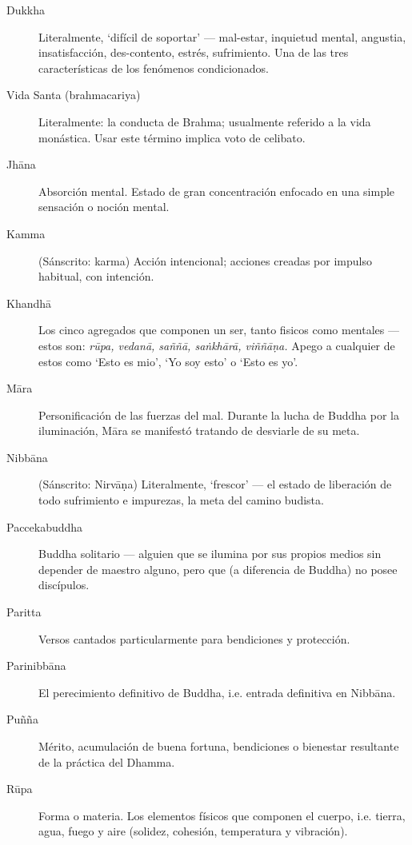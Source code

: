\begin{description}
\item[Dukkha] Literalmente, ‘difícil de soportar’ --- mal-estar, inquietud mental, angustia, insatisfacción, des-contento, estrés, sufrimiento. Una de las tres características de los fenómenos condicionados.

\item[Vida Santa (brahmacariya)] Literalmente: la conducta de Brahma; usualmente referido a la vida monástica. Usar este término implica voto de celibato.

\item[Jhāna] Absorción mental. Estado de gran concentración enfocado en una simple sensación o noción mental.

\item[Kamma] (Sánscrito: karma) Acción intencional; acciones creadas por impulso habitual, con intención.

\item[Khandhā] Los cinco agregados que componen un ser, tanto fisicos como mentales ---
  estos son: \emph{rūpa, vedanā, saññā, saṅkhārā, viññāṇa.} Apego a cualquier de estos como ‘Esto es mio’, ‘Yo soy esto’ o ‘Esto es yo’.

\item[Māra] Personificación de las fuerzas del mal. Durante la lucha de Buddha por la iluminación, Māra se manifestó tratando de desviarle de su meta.

\item[Nibbāna] (Sánscrito: Nirvāṇa) Literalmente, ‘frescor’ --- el estado de liberación de todo sufrimiento e impurezas, la meta del camino budista.

\item[Paccekabuddha] Buddha solitario --- alguien que se ilumina por sus propios medios sin depender de maestro alguno, pero que (a diferencia de Buddha) no posee discípulos.

\item[Paritta] Versos cantados particularmente para bendiciones y protección.

\item[Parinibbāna] El perecimiento definitivo de Buddha, i.e. entrada definitiva en 
  Nibbāna.

\item[Puñña] Mérito, acumulación de buena fortuna, bendiciones o bienestar resultante de la práctica del Dhamma.

\item[Rūpa] Forma o materia. Los elementos físicos que componen el cuerpo,
  i.e. tierra, agua, fuego y aire (solidez, cohesión, temperatura y
  vibración).


\end{description}
